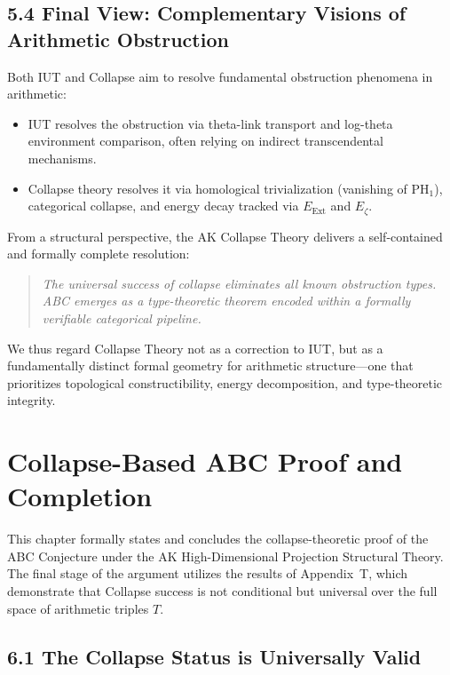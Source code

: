 \documentclass[11pt]{article}
\begin{document}
\subsection{5.4 Final View: Complementary Visions of Arithmetic Obstruction}

Both IUT and Collapse aim to resolve fundamental obstruction phenomena in arithmetic:

\begin{itemize}
    \item IUT resolves the obstruction via theta-link transport and log-theta environment comparison, often relying on indirect transcendental mechanisms.
    \item Collapse theory resolves it via homological trivialization (vanishing of \( \mathrm{PH}_1 \)), categorical collapse, and energy decay tracked via \( E_{\mathrm{Ext}} \) and \( E_{\zeta} \).
\end{itemize}

From a structural perspective, the AK Collapse Theory delivers a self-contained and formally complete resolution:

\begin{quote}
\emph{The universal success of collapse eliminates all known obstruction types.  
ABC emerges as a type-theoretic theorem encoded within a formally verifiable categorical pipeline.}
\end{quote}

We thus regard Collapse Theory not as a correction to IUT, but as a fundamentally distinct formal geometry  
for arithmetic structure—one that prioritizes topological constructibility, energy decomposition, and type-theoretic integrity.





\section{Collapse-Based ABC Proof and Completion}

This chapter formally states and concludes the collapse-theoretic proof of the ABC Conjecture under the AK High-Dimensional Projection Structural Theory.  
The final stage of the argument utilizes the results of Appendix~T, which demonstrate that Collapse success is not conditional but universal over the full space of arithmetic triples \( T \).

\subsection{6.1 The Collapse Status is Universally Valid}
\end{document}
